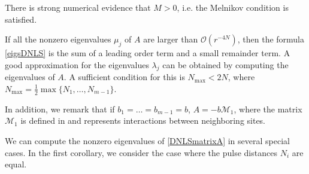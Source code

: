 \documentclass[thesis.tex]{subfiles}
\begin{document}
\begin{remark}
There is strong numerical evidence that $M > 0$, i.e. the Melnikov condition is satisfied.
\end{remark}

\begin{remark}
If all the nonzero eigenvalues $\mu_j$ of $A$ are larger than $\mathcal{O}(r^{-4N})$, then the formula \cref{eigsDNLS} is the sum of a leading order term and a small remainder term. A good approximation for the eigenvalues $\lambda_j$ can be obtained by computing the eigenvalues of $A$. A sufficient condition for this is $N_{\mathrm{max}} < 2 N$, where $N_{\mathrm{max}} = \frac{1}{2} \max\{ N_1, \dots, N_{m-1}\}$.
\end{remark}

\noindent In addition, we remark that if $b_1 = \dots = b_{m-1} = b$, $A = -b \mathcal{M}_1$, where the matrix $\mathcal{M}_1$ is defined in \cite[(2.84)]{Kevrekidis2009} and represents interactions between neighboring sites.

We can compute the nonzero eigenvalues of \cref{DNLSmatrixA} in several special cases. In the first corollary, we consider the case where the pulse distances $N_i$ are equal.
\end{document}
